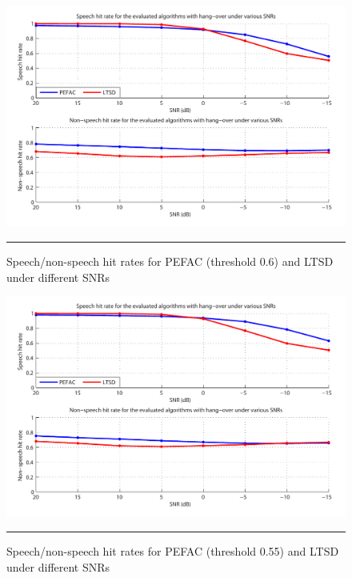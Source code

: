 \begin{figure}[htbp]
	\centering
		\includegraphics[width=0.9\columnwidth]{Figures/Chapter5/pefacSNR60bold.pdf}
		\rule{37em}{0.5pt}
	\caption[Speech/non-speech hit rates for PEFAC (threshold 0.6) and LTSD under different SNRs]{Speech/non-speech hit rates for PEFAC (threshold 0.6) and LTSD under different SNRs}
	\label{fig:pefacSNR60}
\end{figure}

\begin{figure}[htbp]
	\centering
		\includegraphics[width=0.9\columnwidth]{Figures/Chapter5/pefacSNR55bold.pdf}
		\rule{37em}{0.5pt}
	\caption[Speech/non-speech hit rates for PEFAC (threshold 0.55) and LTSD under different SNRs]{Speech/non-speech hit rates for PEFAC (threshold 0.55) and LTSD under different SNRs}
	\label{fig:pefacSNR55}
\end{figure}